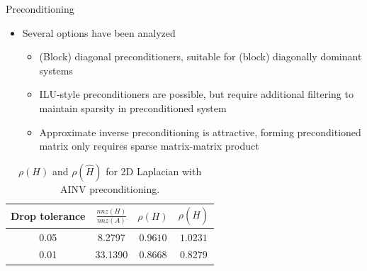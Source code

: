 \documentclass{beamer}
\begin{document}
\begin{frame}{Preconditioning}
  \begin{itemize}
    \item Several options have been analyzed
      \begin{itemize}
        \item (Block) diagonal preconditioners, suitable for (block)
          diagonally dominant systems
        \item ILU-style preconditioners are possible, but require additional
          filtering to maintain sparsity in preconditioned system
        \item Approximate inverse preconditioning is attractive, forming
          preconditioned matrix only requires sparse matrix-matrix product
      \end{itemize}
  \end{itemize}

  \begin{table}
  \centering
  \begin{tabular}{cccc}
  \toprule
  \textbf{Drop tolerance} & \textbf{$\frac{nnz(H)}{nnz(A)}$}& $\rho(H)$
  &$\rho(\hat{H})$\\
  \midrule
   0.05 & 8.2797 & $0.9610$ & $1.0231$  \\
   0.01 & 33.1390 & $0.8668$ & $0.8279$ \\
  \bottomrule
  \end{tabular}
  \caption{$\rho(H)$ and $\rho(\hat{H})$ for 2D
  Laplacian with AINV preconditioning.}
  \label{tab:lap2d_ainv}
  \end{table}
\end{frame}

\end{document}
